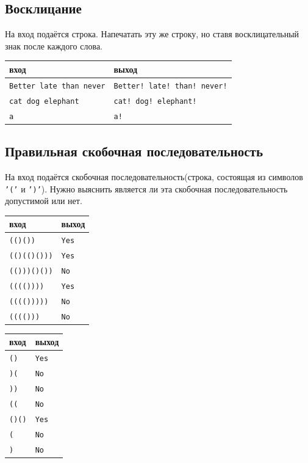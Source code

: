 \documentclass{article}
\begin{document}
\subsection{Восклицание}
На вход подаётся строка. Напечатать эту же строку, но ставя восклицательный знак после каждого слова.
\begin{center}
\begin{tabular}{ l | l }
 вход & выход \\ \hline
 \texttt{Better late than never} & \texttt{Better! late! than! never!} \\
 \texttt{cat \quad dog elephant} & \texttt{cat! \quad dog! elephant!}  \\ 
 \texttt{a} & \texttt{a!} \\
\end{tabular}
\end{center}


\subsection{Правильная скобочная последовательность}
На вход подаётся скобочная последовательность(строка, состоящая из символов \texttt{'('} и \texttt{')'}). Нужно выяснить является ли эта скобочная последовательность допустимой или нет.
\begin{multicols}{2}
\begin{center}
\begin{tabular}{ l | l }
 вход & выход \\ \hline
 \texttt{(()())} & \texttt{Yes} \\
 \texttt{(()(()()))} & \texttt{Yes} \\
 \texttt{(()))()())} & \texttt{No} \\
 \texttt{(((())))} & \texttt{Yes} \\
 \texttt{(((()))))} & \texttt{No} \\
 \texttt{(((()))} & \texttt{No} \\
\end{tabular}
\end{center}

\begin{center}
\begin{tabular}{ l | l }
 вход & выход \\ \hline
 \texttt{()} & \texttt{Yes} \\
 \texttt{)(} & \texttt{No} \\
 \texttt{))} & \texttt{No} \\
 \texttt{((} & \texttt{No} \\
 \texttt{()()} & \texttt{Yes} \\
 \texttt{(} & \texttt{No} \\
 \texttt{)} & \texttt{No} \\
\end{tabular}
\end{center}
\end{multicols}
\end{document}
